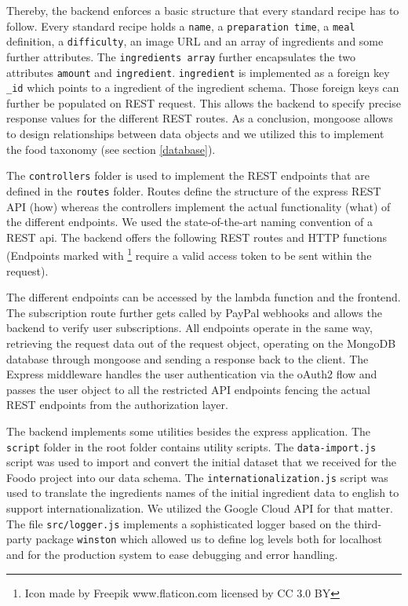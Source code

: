 Thereby, the backend enforces a basic structure that every standard recipe has to follow. Every standard recipe holds a \texttt{name}, a \texttt{preparation time}, a \texttt{meal} definition, a \texttt{difficulty}, an image URL and an array of ingredients and some further attributes. The \texttt{ingredients array} further encapsulates the two attributes \texttt{amount} and \texttt{ingredient}. \texttt{ingredient} is implemented as a foreign key \texttt{\_id} which points to a ingredient of the ingredient schema. Those foreign keys can further be populated on REST request. This allows the backend to specify precise response values for the different REST routes.  As a conclusion, mongoose allows to design relationships between data objects and we utilized this to implement the food taxonomy (see section \ref{database}).

The \texttt{controllers} folder is used to implement the REST endpoints that are defined in the \texttt{routes} folder. Routes define the structure of the express REST API (how) whereas the controllers implement the actual functionality (what) of the different endpoints. We used the state-of-the-art naming convention of a REST api. The backend offers the following REST routes and HTTP functions (Endpoints marked with \lockicon\footnote{Icon made by Freepik www.flaticon.com licensed by CC 3.0 BY} require a valid access token to be sent within the request).



The different endpoints can be accessed by the lambda function and the frontend. The subscription route further gets called by PayPal webhooks and allows the backend to verify user subscriptions. All endpoints operate in the same way, retrieving the request data out of the request object, operating on the MongoDB database through mongoose and sending a response back to the client. The Express middleware handles the user authentication via the oAuth2 flow and passes the user object to all the restricted API endpoints fencing the actual REST endpoints from the authorization layer. 
\clearpage


The backend implements some utilities besides the express application. The \texttt{script} folder in the root folder contains utility scripts. The \texttt{data-import.js} script was used to import and convert the initial dataset that we received for the Foodo project into our data schema. The \texttt{internationalization.js} script was used to translate the ingredients names of the initial ingredient data to english to support internationalization. We utilized the Google Cloud API for that matter. The file \texttt{src/logger.js} implements a sophisticated logger based on the third-party package \texttt{winston} which allowed us to define log levels both for localhost and for the production system to ease debugging and error handling. 

